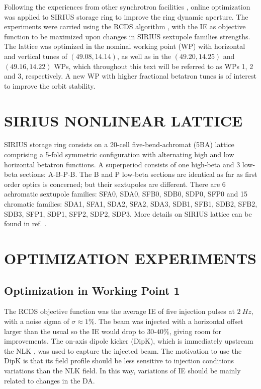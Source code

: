 \documentclass[a4paper,
               keeplastbox,   %
               ]{jacow}
\begin{document}
Following the experiences from other synchrotron facilities \cite{Huang:2015, Liuzzo:IPAC2016-THPMR015, Olsson:IPAC2018-WEPAL047, yang:ipac2022-tupopt064}, online optimization was applied to SIRIUS storage ring to improve the ring dynamic aperture. The experiments were carried using the RCDS algorithm \cite{Huang:2013}, with the IE as objective function to be maximized upon changes in SIRIUS sextupole families strengths. The lattice was optimized in the nominal working point (WP) with horizontal and vertical tunes of $(49.08, 14.14)$, as well as in the $(49.20, 14.25)$ and $(49.16, 14.22)$  WPs, which throughout this text will be referred to as WPs 1, 2 and 3, respectively. A new WP with higher fractional betatron tunes is of interest to improve the orbit stability.

\section{SIRIUS NONLINEAR LATTICE}
 SIRIUS storage ring consists on a 20-cell five-bend-achromat (5BA) lattice 
 comprising a 5-fold symmetric configuration with alternating high and low horizontal betatron functions. A superperiod consists of one high-beta and 3 low-beta sections: A-B-P-B. The B and P low-beta sections are identical as far as first order optics is concerned; but their sextupoles are different. There are 6 achromatic sextupole families: SFA0, SDA0, SFB0, SDB0, SDP0, SFP0 and 15 chromatic families: SDA1, SFA1, SDA2, SFA2, SDA3, SDB1, SFB1, SDB2, SFB2, SDB3, SFP1, SDP1, SFP2, SDP2, SDP3. More details on SIRIUS lattice can be found in ref. \cite{Liu:IPAC2016-THPMR013}.

\section{OPTIMIZATION EXPERIMENTS}

\subsection{Optimization in Working Point 1}
The RCDS objective function was the average IE of five injection pulses at $2~\unit{Hz}$, with a noise sigma of $\sigma \approx 1\%$. The beam was injected with a horizontal offset larger than the usual so the IE would drop to $30$-$40\%$, giving room for improvements. The on-axis dipole kicker (DipK), which is immediately upstream the NLK \cite{Liu:IPAC2016-THPMR011}, was used to capture the injected beam. The motivation to use the DipK is that its field profile should be less sensitive to injection conditions variations than the NLK field. In this way, variations of IE should be mainly related to changes in the DA.
\end{document}
